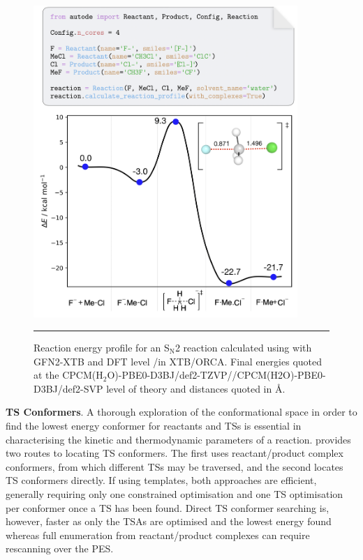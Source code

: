 \documentclass[../../main.tex]{subfiles}
\begin{document}
\begin{figure}[h!]
	\vspace{0.4cm}
	\centering
	\includegraphics[width=10cm]{5/autode/figs/fig5}
	\vspace{0.4cm}
	\hrule
	\caption{Reaction energy profile for an S$_\text{N}$2 reaction calculated using \ade with GFN2-XTB and DFT level \lmethod/\hmethod in XTB/ORCA. Final energies quoted at the CPCM(H$_2$O)-PBE0-D3BJ/def2-TZVP//CPCM(H2O)-PBE0-D3BJ/def2-SVP level of theory and distances quoted in \AA.}
	\label{fig::ade_5}
\end{figure}

{\bfseries{TS Conformers}}. A thorough exploration of the conformational space in order to find the lowest energy conformer for reactants and TSs is essential in characterising the kinetic and thermodynamic parameters of a reaction. \ade provides two routes to locating TS conformers. The first uses reactant/product complex conformers, from which different TSs may be traversed, and the second locates TS conformers directly. If using templates, both approaches are efficient, generally requiring only one constrained optimisation and one TS optimisation per conformer once a TS has been found. Direct TS conformer searching is, however, faster as only the TSAs are optimised and the lowest energy found whereas full enumeration from reactant/product complexes can require rescanning over the PES.
\end{document}
